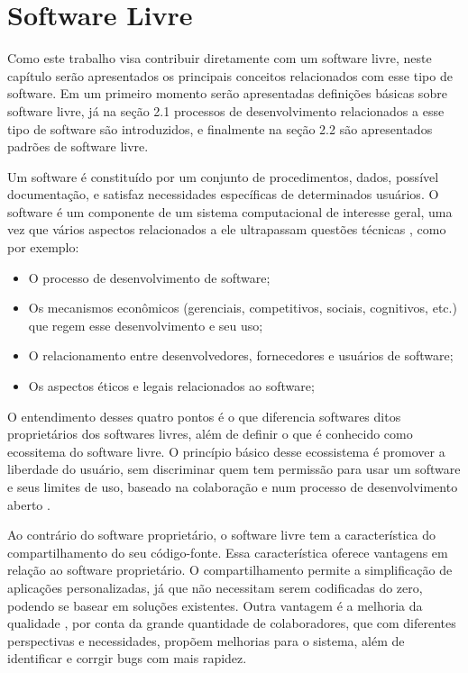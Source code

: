 \chapter{Software Livre}

Como este trabalho visa contribuir diretamente com um software livre, neste capítulo serão apresentados os principais conceitos relacionados com esse tipo de software. Em um primeiro momento serão apresentadas definições básicas sobre software livre, já na seção 2.1 processos de desenvolvimento relacionados a esse tipo de software são introduzidos, e finalmente na seção 2.2 são apresentados padrões de software livre.

Um software é constituído por um conjunto de procedimentos, dados, possível documentação, e satisfaz necessidades específicas de determinados usuários. O software é um componente de um sistema computacional de interesse geral, uma vez que vários aspectos relacionados a ele ultrapassam questões técnicas \cite{meirelles2013metrics}, como por exemplo: 

\begin{itemize}
\item O processo de desenvolvimento de software;
\item Os mecanismos econômicos (gerenciais, competitivos, sociais, cognitivos, etc.) que regem esse desenvolvimento e seu uso;
\item O relacionamento entre desenvolvedores, fornecedores e usuários de software;
\item Os aspectos éticos e legais relacionados ao software;
\end{itemize}

O entendimento desses quatro pontos é o que diferencia softwares ditos proprietários dos softwares livres, além de definir o que é conhecido como ecossitema do software livre. O princípio básico desse ecossistema é promover a liberdade do usuário, sem discriminar quem tem permissão para usar um software e seus limites de uso, baseado na colaboração e num processo de desenvolvimento aberto \cite{meirelles2013metrics}.

Ao contrário do software proprietário, o software livre tem a característica do compartilhamento do seu código-fonte. Essa característica oferece vantagens em relação ao software proprietário. O compartilhamento permite a simplificação de aplicações personalizadas, já que não necessitam serem codificadas do zero, podendo se basear em soluções existentes. Outra vantagem é a melhoria da qualidade \cite{Raymond, 1999}, por conta da grande quantidade de colaboradores, que com diferentes perspectivas e necessidades, propõem melhorias para o sistema, além de identificar e corrgir bugs com mais rapidez.

